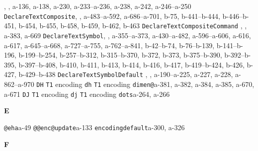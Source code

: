 \documentclass[twoside]{ltxdoc}
\makeatletter
\renewenvironment{theindex}{%
   \@restonecoltrue
   \if@twocolumn\@restonecolfalse\fi
   \columnseprule \z@
   \columnsep 35\p@
   \twocolumn[\index@prologue]%
   \IndexParms
   \let\item\@idxitem
   \ignorespaces
}{\if@restonecol\onecolumn\else\clearpage\fi}
\makeatother
\begin{document}
\begin{theindex}
                , , a-136, a-138, a-230, 
                a-233--a-236, a-238, a-242, a-246--a-250
  \item \texttt  {DeclareTextComposite}\pfill {}, 
                , a-483--a-592, a-686--a-701, b-75, 
                b-441--b-444, b-446--b-451, b-454, b-455, b-458, b-459, 
                b-462, b-463
  \item \texttt  {DeclareTextCompositeCommand}\pfill 
                , , a-383, a-669
  \item \texttt  {DeclareTextSymbol}\pfill {}, 
                , a-355--a-373, a-430--a-482, a-596--a-606, 
                a-616, a-617, a-645--a-668, a-727--a-755, a-762--a-841, 
                b-42--b-74, b-76--b-139, b-141--b-196, b-199--b-254, 
                b-257--b-312, b-315--b-370, b-372, b-373, b-375--b-390, 
                b-392--b-395, b-397--b-408, b-410, b-411, b-413, b-414, 
                b-416, b-417, b-419--b-424, b-426, b-427, b-429--b-438
  \item \texttt  {DeclareTextSymbolDefault}\pfill 
                , , a-190--a-225, a-227, a-228, 
                a-862--a-970
  \item \texttt  {DH}\efill 
    \subitem \texttt  {T1} encoding\pfill {}
  \item \texttt  {dh}\efill 
    \subitem \texttt  {T1} encoding\pfill {}
  \item \texttt  {dimen@}\pfill a-381, a-382, 
                a-384, a-385, a-670, a-671
  \item \texttt  {DJ}\efill 
    \subitem \texttt  {T1} encoding\pfill {}
  \item \texttt  {dj}\efill 
    \subitem \texttt  {T1} encoding\pfill {}
  \item \texttt  {dots}\pfill a-264, a-266

  \indexspace
{\bfseries\hfil E\hfil}\nopagebreak

  \item \texttt  {@eha}\pfill a-49
  \item \texttt  {@@enc@update}\pfill a-133
  \item \texttt  {encodingdefault}\pfill a-300, a-326

  \indexspace
{\bfseries\hfil F\hfil}\nopagebreak


\end{theindex}
\end{document}
